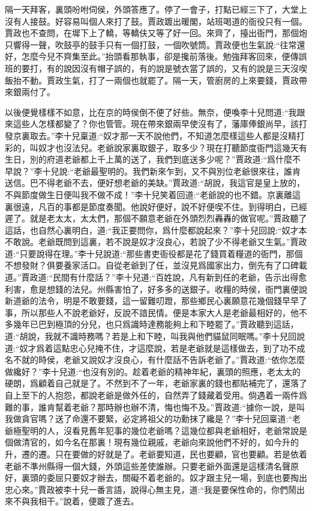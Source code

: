 \begin{parag}
    隔一天拜客，裏頭吩咐伺侯，外頭答應了。停了一會子，打點已經三下了，大堂上沒有人接鼓。好容易叫個人來打了鼓。賈政踱出暖閣，站班喝道的衙役只有一個。賈政也不查問，在墀下上了轎，等轎伕又等了好一回。來齊了，擡出衙門，那個炮只響得一聲，吹鼓亭的鼓手只有一個打鼓，一個吹號筒。賈政便也生氣說:“往常還好，怎麼今兒不齊集至此。”抬頭看那執事，卻是攙前落後。勉強拜客回來，便傳誤班的要打，有的說因沒有帽子誤的，有的說是號衣當了誤的，又有的說是三天沒喫飯抬不動。賈政生氣，打了一兩個也就罷了。隔一天，管廚房的上來要錢，賈政帶來銀兩付了。
\end{parag}


\begin{parag}
    以後便覺樣樣不如意，比在京的時侯倒不便了好些。無奈，便喚李十兒問道:“我跟來這些人怎樣都變了？你也管管。現在帶來銀兩早使沒有了，藩庫俸銀尚早，該打發京裏取去。”李十兒稟道:“奴才那一天不說他們，不知道怎麼樣這些人都是沒精打彩的，叫奴才也沒法兒。老爺說家裏取銀子，取多少？現在打聽節度衙門這幾天有生日，別的府道老爺都上千上萬的送了，我們到底送多少呢？”賈政道:“爲什麼不早說？”李十兒說:“老爺最聖明的。我們新來乍到，又不與別位老爺很來往，誰肯送信。巴不得老爺不去，便好想老爺的美缺。”賈政道:“胡說，我這官是皇上放的，不與節度做生日便叫我不做不成！”李十兒笑着回道:“老爺說的也不錯。京裏離這裏很遠，凡百的事都是節度奏聞。他說好便好，說不好便喫不住。到得明白，已經遲了。就是老太太，太太們，那個不願意老爺在外頭烈烈轟轟的做官呢。”賈政聽了這話，也自然心裏明白，道:“我正要問你，爲什麼都說起來？”李十兒回說:“奴才本不敢說。老爺既問到這裏，若不說是奴才沒良心，若說了少不得老爺又生氣。”賈政道:“只要說得在理。”李十兒說道:“那些書吏衙役都是花了錢買着糧道的衙門，那個不想發財？俱要養家活口。自從老爺到了任，並沒見爲國家出力，倒先有了口碑載道。”賈政道:“民間有什麼話？”李十兒道:“百姓說，凡有新到任的老爺，告示出得愈利害，愈是想錢的法兒。州縣害怕了，好多多的送銀子。收糧的時侯，衙門裏便說新道爺的法令，明是不敢要錢，這一留難叨蹬，那些鄉民心裏願意花幾個錢早早了事，所以那些人不說老爺好，反說不諳民情。便是本家大人是老爺最相好的，他不多幾年已巴到極頂的分兒，也只爲識時達務能夠上和下睦罷了。”賈政聽到這話，道:“胡說，我就不識時務嗎？若是上和下睦，叫我與他們貓鼠同眠嗎。”李十兒回說道:“奴才爲着這點忠心兒掩不住，才這麼說，若是老爺就是這樣做去，到了功不成名不就的時侯，老爺又說奴才沒良心，有什麼話不告訴老爺了。”賈政道:“依你怎麼做纔好？”李十兒道:“也沒有別的。趁着老爺的精神年紀，裏頭的照應，老太太的硬朗，爲顧着自己就是了。不然到不了一年，老爺家裏的錢也都貼補完了，還落了自上至下的人抱怨，都說老爺是做外任的，自然弄了錢藏着受用。倘遇着一兩件爲難的事，誰肯幫着老爺？那時辦也辦不清，悔也悔不及。”賈政道:“據你一說，是叫我做貪官嗎？送了命還不要緊，必定將祖父的功勳抹了纔是？”李十兒回稟道:“老爺極聖明的人，沒看見舊年犯事的幾位老爺嗎？這幾位都與老爺相好，老爺常說是個做清官的，如今名在那裏！現有幾位親戚，老爺向來說他們不好的，如今升的升，遷的遷。只在要做的好就是了。老爺要知道，民也要顧，官也要顧。若是依着老爺不準州縣得一個大錢，外頭這些差使誰辦。只要老爺外面還是這樣清名聲原好，裏頭的委屈只要奴才辦去，關礙不着老爺的。奴才跟主兒一場，到底也要掏出忠心來。”賈政被李十兒一番言語，說得心無主見，道:“我是要保性命的，你們鬧出來不與我相干。”說着，便踱了進去。
\end{parag}


